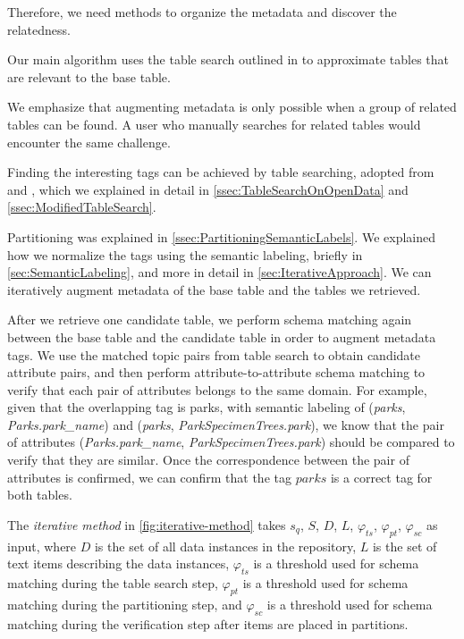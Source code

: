 Therefore, we need methods to organize the metadata and discover the relatedness.

Our main algorithm uses the table search outlined in \cite{Mudgal2018Deep} to approximate tables that are relevant to the base table.

We emphasize that augmenting metadata is only possible when a group of related tables can be found. A user who manually searches for related tables would encounter the same challenge.

Finding the interesting tags can be achieved by table searching, adopted from \cite{Nargesian2018Table} and \cite{conf/esws/EllefiBDT16}, which we explained in detail in \autoref{ssec:TableSearchOnOpenData} and \autoref{ssec:ModifiedTableSearch}.

Partitioning was explained in \autoref{ssec:PartitioningSemanticLabels}. We explained how we normalize the tags using the semantic labeling, briefly in \autoref{sec:SemanticLabeling}, and more in detail in \autoref{sec:IterativeApproach}. We can iteratively augment metadata of the base table and the tables we retrieved.

After we retrieve one candidate table, we perform schema matching again between the base table and the candidate table in order to augment metadata tags. We use the matched topic pairs from table search to obtain candidate attribute pairs, and then perform attribute-to-attribute schema matching to verify that each pair of attributes belongs to the same domain. For example, given that the overlapping tag is parks, with semantic labeling of (\textit{parks}, \textit{Parks.park\_name}) and (\textit{parks}, \textit{Park\-Specimen\-Trees.park}), we know that the pair of attributes (\textit{Parks.park\_name}, \textit{Park\-Specimen\-Trees.park}) should be compared to verify that they are similar. Once the correspondence between the pair of attributes is confirmed, we can confirm that the tag $parks$ is a correct tag for both tables.

The \textit{iterative method} in \autoref{fig:iterative-method} takes $s_q$, $S$, $D$, $L$, $\ensuremath{\varphi}_{ts}$, $\ensuremath{\varphi}_{pt}$, $\ensuremath{\varphi}_{sc}$ as input, where $D$ is the set of all data instances in the repository, $L$ is the set of text items describing the data instances, $\ensuremath{\varphi}_{ts}$ is a threshold used for schema matching during the table search step, $\ensuremath{\varphi}_{pt}$ is a threshold used for schema matching during the partitioning step, and $\ensuremath{\varphi}_{sc}$ is a threshold used for schema matching during the verification step after items are placed in partitions.

